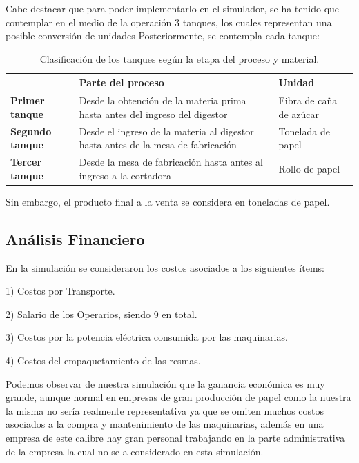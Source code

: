 \documentclass[runningheads]{llncs}
\begin{document}
Cabe destacar que para poder implementarlo en el simulador, se ha tenido que contemplar en el medio de la operación 3 tanques, los cuales representan una posible conversión de unidades
Posteriormente, se contempla cada tanque:

\begin{table}[htbp]
\centering
\caption{Clasificación de los tanques según la etapa del proceso y material.}
\label{tab:procesos_tanques}
\begin{tabular}{|l|p{6.5cm}|p{4.5cm}|}
\hline
 & \textbf{Parte del proceso} & \textbf{Unidad} \\
\hline
\textbf{Primer tanque} & Desde la obtención de la materia prima hasta antes del ingreso del digestor & Fibra de caña de azúcar \\
\hline
\textbf{Segundo tanque} & Desde el ingreso de la materia al digestor hasta antes de la mesa de fabricación & Tonelada de papel\\
\hline
\textbf{Tercer tanque} & Desde la mesa de fabricación hasta antes al ingreso a la cortadora & Rollo de papel \\
\hline
\end{tabular}
\end{table}

Sin embargo, el producto final a la venta se considera en toneladas de papel.


\subsection{Análisis Financiero}
En la simulación se consideraron los costos asociados a los siguientes ítems:


1) Costos por Transporte.


2) Salario de los Operarios, siendo 9 en total.


3) Costos por la potencia eléctrica consumida por las maquinarias.


4) Costos del empaquetamiento de las resmas.


\noindent Podemos observar  de nuestra simulación que la ganancia económica es muy grande,  aunque normal en empresas de gran producción de papel como la nuestra la misma no sería realmente representativa ya que se omiten muchos costos asociados a la compra y mantenimiento de las maquinarias, además en una empresa de este calibre hay gran personal trabajando en la parte administrativa de la empresa la cual no se a considerado en esta simulación.
\end{document}
